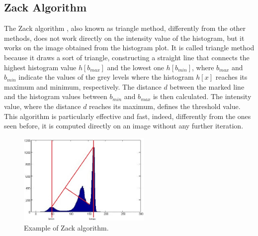 \documentclass[final,a4paper,12pt,english]{UnicaPhdThesis3}
\begin{document}
\subsection{Zack Algorithm} \label{Zack} %
The Zack algorithm \cite{Zack}, also known as triangle method, differently from the other methods, does not work directly on the intensity value of the histogram, but it works on the image obtained from the histogram plot. It is called triangle method because it draws a sort of triangle, constructing a straight line that connects the highest histogram value $h[b_{max}]$ and the lowest one $h[b_{min}]$, where $b_{max}$ and $ b_{min}$ indicate the values of the grey levels where the histogram $h[x]$ reaches its maximum and minimum, respectively. The distance $d$ between the marked line and the histogram values between $b_{min}$ and $b_{max}$ is then calculated. The intensity value, where the distance $d$ reaches its maximum, defines the threshold value. This algorithm is particularly effective and fast, indeed, differently from the ones seen before, it is computed directly on an image without any further iteration.

\begin{figure}[h]
	\centering
	\includegraphics[width=0.57\textwidth]{images/Zack}
	\caption{\label{fig:exampleZack}Example of Zack algorithm.}
\end{figure}
\end{document}
